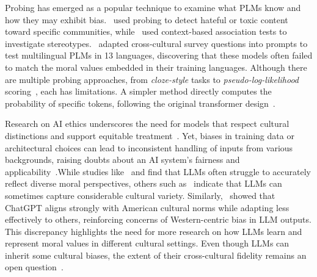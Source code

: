 \documentclass[11pt]{article}
\begin{document}
Probing has emerged as a popular technique to examine what PLMs know and how they may exhibit bias.~\citet{Ousidhoum2021} used probing to detect hateful or toxic content toward specific communities, while~\citet{nadeem2021stereoset} used context-based association tests to investigate stereotypes.~\citet{arora2023probing} adapted cross-cultural survey questions into prompts to test multilingual PLMs in 13 languages, discovering that these models often failed to match the moral values embedded in their training languages. Although there are multiple probing approaches, from \emph{cloze-style} tasks to \emph{pseudo-log-likelihood} scoring~\citep{nadeem2021stereoset, Salazar2019}, each has limitations. A simpler method directly computes the probability of specific tokens, following the original transformer design~\citep{Vaswani2017}.

Research on AI ethics underscores the need for models that respect cultural distinctions and support equitable treatment~\citep{ Zowghi2023, CachatRosset2023, karpouzis2024, meijer2024}. Yet, biases in training data or architectural choices can lead to inconsistent handling of inputs from various backgrounds, raising doubts about an AI system’s fairness and applicability~\citep{karpouzis2024}.While studies like~\citet{arora2023probing} and \citet{Benkler2023} find that LLMs often struggle to accurately reflect diverse moral perspectives, others such as~\citet{ramezani2023knowledge} indicate that LLMs can sometimes capture considerable cultural variety. Similarly,~\citet{cao2023assessing} showed that ChatGPT aligns strongly with American cultural norms while adapting less effectively to others, reinforcing concerns of Western-centric bias in LLM outputs. This discrepancy highlights the need for more research on how LLMs learn and represent moral values in different cultural settings. Even though LLMs can inherit some cultural biases, the extent of their cross-cultural fidelity remains an open question~\citep{caliskan2017semantics}.
\end{document}
